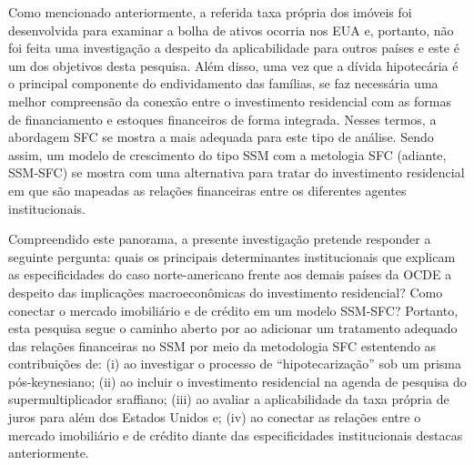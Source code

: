 Como mencionado anteriormente, a referida taxa própria dos imóveis foi desenvolvida para examinar a bolha de ativos ocorria nos EUA e, portanto, não foi feita uma investigação a despeito da aplicabilidade para outros países e este é um dos objetivos desta pesquisa. Além disso, uma vez que a dívida hipotecária é o principal componente do endividamento das famílias, se faz necessária uma melhor compreensão da conexão entre o investimento residencial com as formas de financiamento e estoques financeiros de forma integrada. Nesses termos, a abordagem SFC se mostra a mais adequada para este tipo de análise. Sendo assim, um modelo de crescimento do tipo SSM com a metologia SFC (adiante, SSM-SFC) se mostra com uma alternativa para tratar do investimento residencial em que são mapeadas as relações financeiras entre os diferentes agentes institucionais.


Compreendido este panorama, a presente investigação pretende responder a seguinte pergunta: quais os principais determinantes institucionais que explicam as especificidades do caso norte-americano frente aos demais países da OCDE a despeito das implicações macroeconômicas do investimento residencial? Como conectar o mercado imobiliário e de crédito em um modelo SSM-SFC? 
Portanto, esta pesquisa segue o caminho aberto por \textcite{brochier_supermultiplier_2018} ao adicionar um tratamento adequado das relações financeiras no SSM por meio da metodologia SFC estentendo as contribuições de: 
(i) \textcite{jorda_great_2014} ao investigar o processo de ``hipotecarização'' sob um prisma pós-keynesiano; 
(ii) \textcite{serrano_sraffian_1995} ao incluir o investimento residencial na agenda de pesquisa do supermultiplicador sraffiano; 
(iii) \textcite{teixeira_crescimento_2015} ao avaliar a aplicabilidade da taxa própria de juros para além dos Estados Unidos e;
(iv) \textcite{da_silveira_investimento_2019} ao conectar as relações entre o mercado imobiliário e de crédito diante das especificidades institucionais destacas anteriormente. 